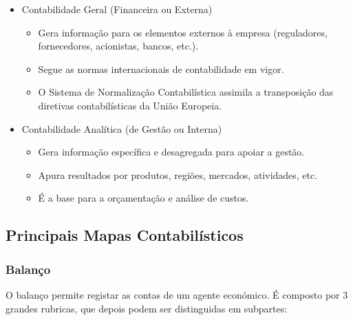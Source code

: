 \documentclass[11pt]{article}
\begin{document}
\begin{itemize}
    \item Contabilidade Geral (Financeira ou Externa)
          \begin{itemize}
              \item Gera informação para os elementos externos à empresa         (reguladores, fornecedores, acionistas, bancos, etc.).
              \item Segue as normas internacionais de contabilidade em vigor.
              \item O Sistema de Normalização Contabilística assimila a
                    transposição das diretivas contabilísticas da União Europeia.
          \end{itemize}
    \item Contabilidade Analítica (de Gestão ou Interna)
          \begin{itemize}
              \item Gera informação específica e desagregada para apoiar a gestão.
              \item Apura resultados por produtos, regiões, mercados, atividades, etc.
              \item É a base para a orçamentação e análise de custos.
          \end{itemize}
\end{itemize}

\subsection{Principais Mapas Contabilísticos}

\subsubsection{Balanço}

O balanço permite registar as contas de um agente económico. É composto por 3 grandes rubricas, que depois podem ser distinguidas em subpartes:
\end{document}
